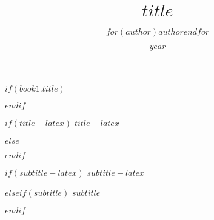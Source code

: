 \documentclass%
[crop=true,varwidth,border=0.50001bp,11pt]
{book} %
\title{$title$}
\author{$for(author)$$author$$endfor$}
\date{$year$}
\begin{document}
\frontmatter




\clearpage


$if(book1.title)$

$endif$

\clearpage{\thispagestyle{empty}\cleardoublepage}

\pagestyle{empty}
  \begin{spacing}{.75}
  \begin{center}

  \vspace*{3cm}

$if(title-latex)$
  \makeatletter \Huge \bfseries \titlefont \textbf{\textsc{$title-latex$}} \par \makeatother    
$else$
  \makeatletter \Huge \bfseries \titlefont \textbf{\textsc{\@title}} \par \makeatother    
$endif$

  \vspace{1cm}
    
$if(subtitle-latex)$
  \Large \primaryfont $subtitle-latex$ \par
$elseif(subtitle)$
  \Large \primaryfont $subtitle$ \par
$endif$
    
  \vspace{4cm}
    
  \Large \normalfont \sansfont  \makeatletter \MakeUppercase\@author \makeatother \par

  \end{center}
  \end{spacing}

\clearpage
\end{document}
